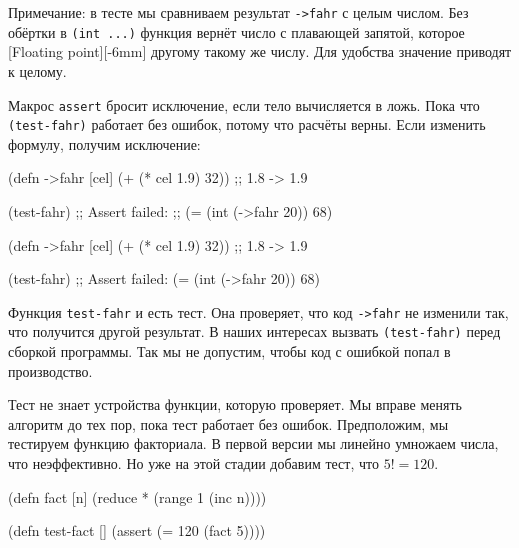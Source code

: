 Примечание: в тесте мы сравниваем результат \verb|->fahr| с целым числом. Без
обёртки в \verb|(int ...)| функция вернёт число с плавающей запятой, которое
[Floating point][-6mm]
другому такому же числу. Для удобства значение приводят к целому.

Макрос \verb|assert| бросит исключение, если тело вычисляется в ложь. Пока что
\verb|(test-fahr)| работает без ошибок, потому что расчёты верны. Если изменить
формулу, получим исключение:

\ifx\DEVICETYPE\MOBILE

\begin{english}
  \begin{clojure}
(defn ->fahr [cel]
  (+ (* cel 1.9) 32)) ;; 1.8 -> 1.9

(test-fahr)
;; Assert failed:
;; (= (int (->fahr 20)) 68)
  \end{clojure}
\end{english}

\else

\begin{english}
  \begin{clojure}
(defn ->fahr [cel]
  (+ (* cel 1.9) 32)) ;; 1.8 -> 1.9

(test-fahr)
;; Assert failed: (= (int (->fahr 20)) 68)
  \end{clojure}
\end{english}

\fi

Функция \verb|test-fahr| и есть тест. Она проверяет, что код \verb|->fahr|
не изменили так, что получится другой результат. В наших интересах вызвать
\verb|(test-fahr)| перед сборкой программы. Так мы не допустим, чтобы код с
ошибкой попал в производство.


Тест не знает устройства функции, которую проверяет. Мы вправе менять алгоритм
до тех пор, пока тест работает без ошибок. Предположим, мы тестируем функцию
факториала. В первой версии мы линейно умножаем числа, что неэффективно. Но уже
на этой стадии добавим тест, что $5! = 120$.

\begin{english}
  \begin{clojure}
(defn fact [n]
  (reduce * (range 1 (inc n))))

(defn test-fact []
  (assert (= 120 (fact 5))))
  \end{clojure}
\end{english}

